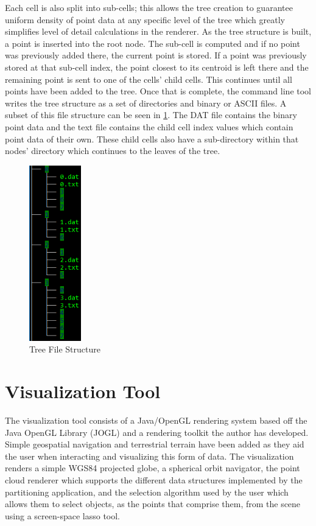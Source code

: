 Each cell is also split into sub-cells; this allows the tree creation to
guarantee uniform density of point data at any specific level of the tree which
greatly simplifies level of detail calculations in the renderer. As the tree
structure is built, a point is inserted into the root node. The sub-cell is
computed and if no point was previously added there, the current point is
stored. If a point was previously stored at that sub-cell index, the point
closest to its centroid is left there and the remaining point is sent to one of
the cells' child cells. This continues until all points have been added to the
tree. Once that is complete, the command line tool writes the tree structure as
a set of directories and binary or ASCII files. A subset of this file structure
can be seen in \ref{fig:fileStructure}. The DAT file contains the binary point data and the
text file contains the child cell index values which contain point data of their
own. These child cells also have a sub-directory within that nodes’ directory
which continues to the leaves of the tree.

\begin{figure}[htp]
\begin{center}
  \includegraphics[height=3.0in]{images/filestructure.png}
  \caption{Tree File Structure}
  \label{fig:fileStructure}
\end{center}
\end{figure}

\section{Visualization Tool}

The visualization tool consists of a Java/OpenGL rendering system based off the
Java OpenGL Library (JOGL) and a rendering toolkit the author has developed.
Simple geospatial navigation and terrestrial terrain have been added as they aid
the user when interacting and visualizing this form of data. The visualization
renders a simple WGS84 projected globe, a spherical orbit navigator, the point
cloud renderer which supports the different data structures implemented by the
partitioning application, and the selection algorithm used by the user which
allows them to select objects, as the points that comprise them, from the scene
using a screen-space lasso tool.

